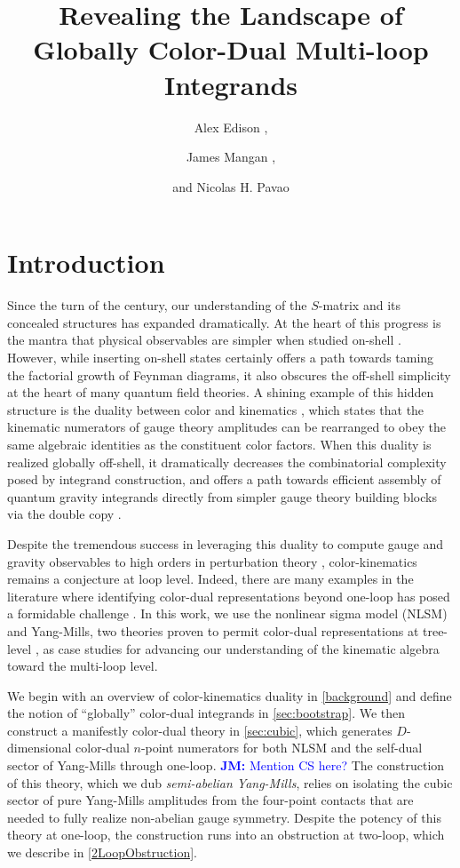 \documentclass[11pt,letter]{article}
\author{\large Alex Edison \orcidlink{0000-0002-5430-9500},}
\author{\large James Mangan  \orcidlink{0000-0002-9713-7446},}
\author{\large and Nicolas H. Pavao \orcidlink{0000-0002-9817-8266}}
\affiliation{Department of Physics and Astronomy, Northwestern
  University, Evanston, Illinois 60208, USA}
\title{\center  \fontsize{18}{20} \selectfont  Revealing the Landscape of Globally Color-Dual Multi-loop Integrands}
\newcommand{\jm}[1]{\textcolor{blue}{\textbf{JM: }{#1}}}
\begin{document}
\maketitle
\flushbottom
 

\section{Introduction}\label{intro}
Since the turn of the century, our understanding of the $S$-matrix and
its concealed structures has expanded dramatically. At the heart of this
progress is the mantra that physical observables are simpler when
studied on-shell
\cite{Parke:1986gb,TasiLance,Cheung:2017pzi}. However, while inserting on-shell states certainly offers a path towards taming the
factorial growth of Feynman diagrams, it also obscures the off-shell
simplicity at the heart of many quantum field theories. A shining
example of this hidden structure is the duality between color and
kinematics \cite{BCJ,Bern:2010ue,BCJreview}, which states that the
kinematic numerators of gauge theory amplitudes can be rearranged to
obey the same algebraic identities as the constituent color
factors. When this duality is realized globally off-shell, it
dramatically decreases the combinatorial complexity posed by integrand
construction, and offers a path towards efficient assembly of quantum
gravity integrands directly from simpler gauge theory building blocks
via the double copy \cite{BCJ,Bern:2010ue}.

Despite the tremendous success in leveraging this duality to
compute gauge and gravity observables to high orders in perturbation
theory \cite{FiveLoopN4, GeneralizedDoubleCopyFiveLoops, Bern:2018jmv,
  Carrasco:2021otn}, color-kinematics remains a conjecture at loop
level. Indeed, there are many examples in the literature where
identifying color-dual representations beyond one-loop has posed a
formidable challenge
\cite{Mogull:2015adi, Johansson:2017bfl, KalinN2TwoLoop, Bern:2015ooa}. In this work, we use
the nonlinear sigma model (NLSM) and Yang-Mills, two theories proven
to permit color-dual representations at tree-level
\cite{Feng:2010my,Cachazo:2014xea}, as case studies for advancing our
understanding of the kinematic algebra toward the multi-loop level.

We begin with an overview of color-kinematics duality in
\cref{background} and define the notion of ``globally'' color-dual integrands in \cref{sec:bootstrap}. 
We then construct a manifestly color-dual theory in
\cref{sec:cubic}, which generates $D$-dimensional color-dual $n$-point
numerators for both NLSM and the self-dual sector of Yang-Mills
through one-loop. \jm{Mention CS here?} The construction of this theory, which we dub
\textit{semi-abelian Yang-Mills}, relies on isolating the cubic sector
of pure Yang-Mills amplitudes from the four-point contacts that are
needed to fully realize non-abelian gauge symmetry. Despite the
potency of this theory at one-loop, the construction runs into an
obstruction at two-loop, which we describe in \cref{2LoopObstruction}.
\end{document}
